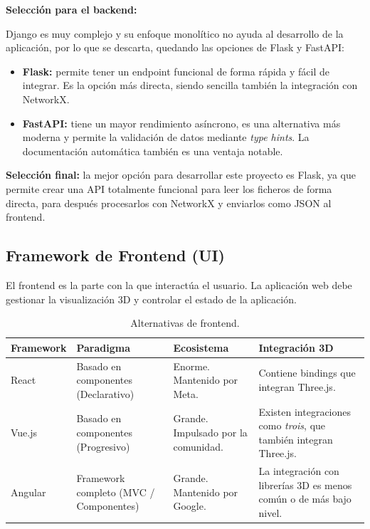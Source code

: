 \textbf{Selección para el backend:}

Django es muy complejo y su enfoque monolítico no ayuda al desarrollo de la aplicación,
por lo que se descarta, quedando las opciones de Flask y FastAPI:

\begin{itemize}
	\item \textbf{Flask:} permite tener un endpoint funcional de forma rápida y fácil de
		integrar. Es la opción más directa, siendo sencilla también la integración con
		NetworkX.
	\item \textbf{FastAPI:} tiene un mayor rendimiento asíncrono, es una alternativa más
		moderna y permite la validación de datos mediante \textit{type hints}. La
		documentación automática también es una ventaja notable.
\end{itemize}

\textbf{Selección final:} la mejor opción para desarrollar este proyecto es Flask, ya que
permite crear una API totalmente funcional para leer los ficheros de forma directa, para
después procesarlos con NetworkX y enviarlos como JSON al frontend.

\subsection{Framework de Frontend (UI)}

El frontend es la parte con la que interactúa el usuario. La aplicación web debe gestionar la
visualización 3D y controlar el estado de la aplicación.

\begin{table}[H]
	\centering
	\caption{Alternativas de frontend.}
	\small
	\begin{tabularx}{\textwidth}{>{\raggedright\arraybackslash}p{2.1cm} >{\raggedright\arraybackslash}p{3.0cm} >{\raggedright\arraybackslash}p{3.0cm} >{\raggedright\arraybackslash}X}
		\toprule
		\textbf{Framework} & \textbf{Paradigma} & \textbf{Ecosistema} & \textbf{Integración 3D} \\
		\midrule
		React & Basado en componentes (Declarativo) &
			Enorme. Mantenido por Meta. &
			Contiene bindings que integran Three.js. \\
		\addlinespace
		Vue.js & Basado en componentes (Progresivo) &
			Grande. Impulsado por la comunidad. &
			Existen integraciones como \textit{trois}, que también integran Three.js. \\
		\addlinespace
		Angular & Framework completo (MVC / Componentes) &
			Grande. Mantenido por Google. &
			La integración con librerías 3D es menos común o de más bajo nivel. \\
		\bottomrule
	\end{tabularx}
\end{table}

